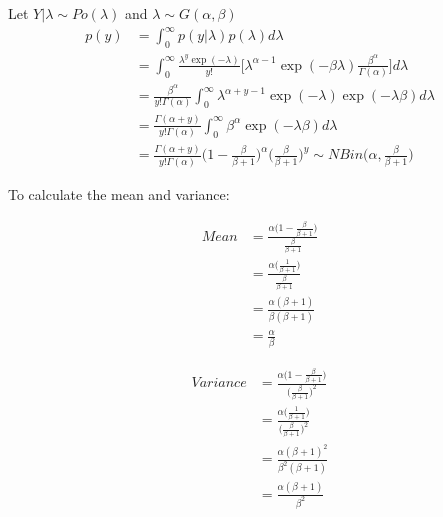 Let $Y|\lambda \sim Po(\lambda)$ and $\lambda \sim G(\alpha,\beta)$
\begin{align*}
p(y)&=\int^\infty_0 p(y|\lambda) p(\lambda) d\lambda\\
&=\int^\infty_0 \frac{\lambda^y\exp(-\lambda)}{y!}\Bigg[\lambda^{\alpha-1}\exp(-\beta\lambda)\frac{\beta^\alpha}{\Gamma(\alpha)}\Bigg]d\lambda\\
&=\frac{\beta^\alpha}{y!\Gamma(\alpha)}\int^\infty_0 \lambda^{\alpha+y-1}\exp(-\lambda)\exp(-\lambda\beta)d\lambda\\
&=\frac{\Gamma(\alpha+y)}{y!\Gamma(\alpha)}\int^\infty_0 \beta^\alpha \exp(-\lambda\beta)d\lambda\\
&=\frac{\Gamma(\alpha+y)}{y!\Gamma(\alpha)}\Bigg(1-\frac{\beta}{\beta+1}\Bigg)^{\alpha}\Bigg(\frac{\beta}{\beta+1}\Bigg)^y \sim NBin \Bigg(\alpha, \frac{\beta}{\beta+1}\Bigg)
\end{align*}

To calculate the mean and variance:

\begin{align*}
Mean &= \frac{\alpha\bigg(1-\frac{\beta}{\beta+1}\bigg)}{\frac{\beta}{\beta+1}}\\
&= \frac{\alpha\bigg (\frac{1}{\beta+1}\bigg)}{\frac{\beta}{\beta+1}}\\
&= \frac{\alpha(\beta+1)}{\beta(\beta+1)}\\
&= \frac{\alpha}{\beta}
\end{align*}

\begin{align*}
Variance &= \frac{\alpha\bigg(1-\frac{\beta}{\beta+1}\bigg)}{\bigg(\frac{\beta}{\beta+1}\bigg)^2}\\
&= \frac{\alpha\bigg (\frac{1}{\beta+1}\bigg)}{\bigg(\frac{\beta}{\beta+1}\bigg)^2}\\
&= \frac{\alpha(\beta+1)^2}{\beta^2(\beta+1)}\\
&= \frac{\alpha(\beta+1)}{\beta^2}
\end{align*}




